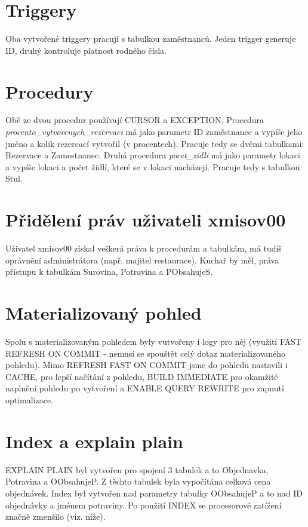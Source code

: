 \documentclass[11pt, a4paper]{article}[]
\begin{document}
    \section{Triggery}
    Oba vytvořené triggery pracují s tabulkou zaměstnanců. Jeden trigger generuje
    ID, druhý kontroluje platnost rodného čísla.

    \section{Procedury}
    Obě ze dvou procedur používají CURSOR a EXCEPTION. Procedura  \textit{procento\_vytvorenych\_rezervaci}
    má jako parametr ID zaměstnance a vypíše jeho jméno a kolik rezercací vytvořil
    (v procentech). Pracuje tedy se dvěmi tabulkami: Rezervace a Zamestnanec.
    Druhá procedura \textit{pocet\_zidli} má jako parametr lokaci a vypíše
    lokaci a počet židlí, které se v lokaci nacházejí. Pracuje tedy s tabulkou
    Stul.

    \section{Přidělení práv uživateli xmisov00}
    Uživatel xmisov00 získal veškerá práva k procedurám a tabulkám, má tudíš
    oprávnění administrátora (např. majitel restaurace). Kuchař by měl, práva
    přístupu k tabulkám Surovina, Potravina a PObsahujeS.

    \section{Materializovaný pohled}
    Spolu s materializovaným pohledem byly vutvořeny i logy pro něj (využití
    FAST REFRESH ON COMMIT - nemusí se spouštět celý dotaz materializovaného
    pohledu). Mimo REFRESH FAST ON COMMIT jsme do pohledu nastavili i CACHE,
    pro lepší načítání z pohledu, BUILD IMMEDIATE pro okamžité naplnění pohledu
    po vytvoření a ENABLE QUERY REWRITE pro zapnutí optimalizace.

    \section{Index a explain plain}
    EXPLAIN PLAIN byl vytvořen pro spojení 3 tabulek a to Objednavka, Potravina
    a OObsahujeP. Z těchto tabulek byla vypočítána celková cena objednávek.
    Index byl vytvořen nad parametry tabulky OObsahujeP a to nad ID objednávky
    a jménem potraviny. Po použití INDEX se procesorové zatížení značně zmenšilo
    (viz. níže).
\end{document}
